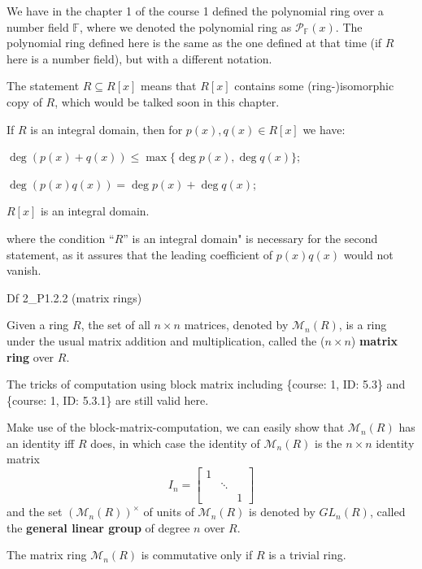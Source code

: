 \documentclass{article}
\begin{document}
\begin{Rmk}{}
    \begin{compactenum}
        \item We have in the chapter 1 of the course 1 defined the polynomial ring over a number field $\mathbb{F}$, where we denoted the polynomial ring as $\mathcal{P}_\mathbb{F}(x)$. The polynomial ring defined here is the same as the one defined at that time (if $R$ here is a number field), but with a different notation.
        \item The statement $R\subseteq R[x]$ means that $R[x]$ contains some (ring-)isomorphic copy of $R$, which would be talked soon in this chapter.
        \item \textcolor{Th}{If $R$ is an integral domain, then for $p(x), q(x)\in R[x]$ we have:
        \begin{compactenum}
            \item $\deg(p(x) + q(x)) \leq \max\{\deg p(x), \deg q(x)\}$;
            \item $\deg(p(x)q(x)) = \deg p(x) + \deg q(x)$;
            \item $R[x]$ is an integral domain.
        \end{compactenum}}
        where the condition ``$R$'' is an integral domain" is necessary for the second statement, as it assures that the leading coefficient of $p(x)q(x)$ would not vanish.
    \end{compactenum}
\end{Rmk}

\begin{Df}{Df 2\_P1.2.2 (matrix rings)}
    \begin{compactenum}
        \item \textcolor{Th}{Given a ring $R$, the set of all $n\times n$ matrices, denoted by $\mathcal{M}_n(R)$, is a ring under the usual matrix addition and multiplication,} called the ($n\times n$) \textbf{matrix ring} over $R$. 
        \item \textcolor{Th}{The tricks of computation using block matrix including \{course: 1, ID: 5.3\} and \{course: 1, ID: 5.3.1\} are still valid here.}
        \item Make use of the block-matrix-computation, we can easily show that \textcolor{Th}{$\mathcal{M}_n(R)$ has an identity iff $R$ does, in which case the identity of $\mathcal{M}_n(R)$ is the $n\times n$ identity matrix
        $$ I_n = \begin{bmatrix}
            1 & & \\
            & \ddots & \\
            & & 1
        \end{bmatrix} $$}
        and the set $(\mathcal{M}_n(R))^\times$ of units of $\mathcal{M}_n(R)$ is denoted by $GL_n(R)$, called the \textbf{general linear group} of degree $n$ over $R$.
        \item \textcolor{Th}{The matrix ring $\mathcal{M}_n(R)$ is commutative only if $R$ is a trivial ring.}
    \end{compactenum}
\end{Df}
\end{document}
